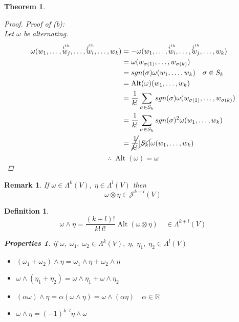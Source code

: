 \documentclass[11pt]{article}
\def\maj{\mathcal{J}}
\def\RR{\mathbb{R}}
\DeclareMathOperator{\alt}{Alt}
\newtheorem{theorem}{Theorem}[section]
\newtheorem{definition}{Definition}[section]
\newtheorem*{remark}{Remark}
\newtheorem*{properties}{Properties}
\begin{document}
\begin{theorem}
\begin{proof}
 Proof of (b):\\
Let $\omega$ be alternating.
\begin{align*}
\omega(w_1, \dots , \overset{i^{th}}{w_j} , \dots , \overset{j^{th}}{w_i} , \dots , w_k) &= - \omega(w_1, \dots , \overset{i^{th}}{w_i} , \dots , \overset{j^{th}}{w_j} , \dots , w_k)\\ &=\omega(w_{\sigma(1)} , \dots , w_{\sigma(k)})\\
&=sgn(\sigma)\omega(w_1,  \dots , w_k) \quad \sigma \in S_k \\
&=\alt(\omega)(w_1,  \dots , w_k)\\
&= \frac{1}{k!}\sum\limits_{\sigma \in S_k}sgn(\sigma)\omega(w_{\sigma(1)}, \dots , w_{\sigma(k)})\\
&= \frac{1}{k!}\sum\limits_{\sigma \in S_k}sgn(\sigma)^2 \omega(w_{1}, \dots , w_{k})\\
&=\cancel{\frac{1}{k!}}\cancel{|S_k|}\omega(w_{1}, \dots , w_{k})
\end{align*}
\[\therefore \; \alt(\omega)=\omega\]
\end{proof}
\end{theorem}

\begin{remark}
If $\omega \in \Lambda^k(V), \; \eta \in \Lambda^l(V)$ then 
\[\omega \otimes \eta \in \maj^{k+l}(V)\]
\end{remark}

\begin{definition}
\[\omega \wedge \eta = \frac{(k+l)!}{k!\,l!}\alt(\omega \otimes \eta) \quad \in \Lambda^{k+l}(V)\]
\begin{properties} if $\omega, \;\omega_1,\; \omega_2 \in \Lambda^k(V), \; \eta, \; \eta_1, \; \eta_2 \in \Lambda^l(V)$
\begin{itemize}
\item $(\omega_1 + \omega_2)\wedge\eta = \omega_1\wedge\eta + \omega_2\wedge\eta$
\item $\omega\wedge(\eta_1 + \eta_2)  = \omega\wedge\eta_1 + \omega\wedge\eta_2$
\item $(\alpha\omega)\wedge\eta = \alpha(\omega\wedge\eta) = \omega\wedge(\alpha\eta) \quad \alpha \in \RR$
\item $\omega\wedge\eta = (-1)^{k\cdot l}\eta\wedge\omega$
\end{itemize}
\end{properties}
\end{definition}
\end{document}
